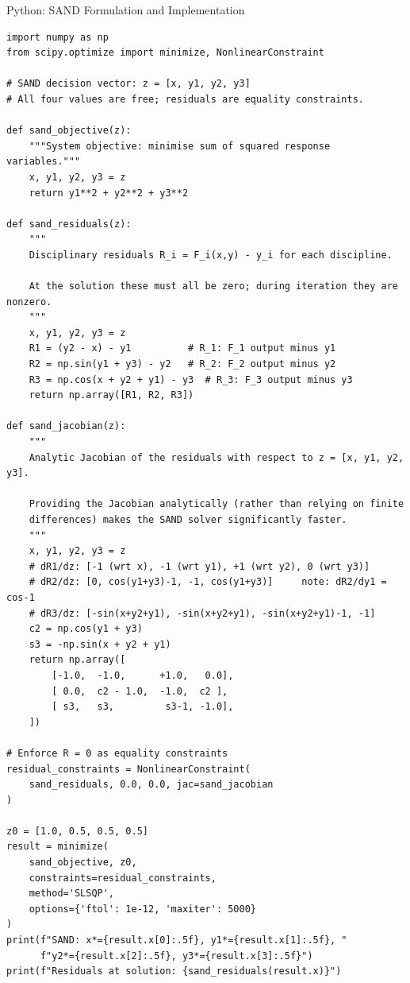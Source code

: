 \documentclass[aspectratio=169,10pt]{beamer}
\begin{document}
\begin{frame}[fragile]{Python: SAND Formulation and Implementation}

  \begin{lstlisting}[style=python]
import numpy as np
from scipy.optimize import minimize, NonlinearConstraint

# SAND decision vector: z = [x, y1, y2, y3]
# All four values are free; residuals are equality constraints.

def sand_objective(z):
    """System objective: minimise sum of squared response variables."""
    x, y1, y2, y3 = z
    return y1**2 + y2**2 + y3**2

def sand_residuals(z):
    """
    Disciplinary residuals R_i = F_i(x,y) - y_i for each discipline.

    At the solution these must all be zero; during iteration they are nonzero.
    """
    x, y1, y2, y3 = z
    R1 = (y2 - x) - y1          # R_1: F_1 output minus y1
    R2 = np.sin(y1 + y3) - y2   # R_2: F_2 output minus y2
    R3 = np.cos(x + y2 + y1) - y3  # R_3: F_3 output minus y3
    return np.array([R1, R2, R3])

def sand_jacobian(z):
    """
    Analytic Jacobian of the residuals with respect to z = [x, y1, y2, y3].

    Providing the Jacobian analytically (rather than relying on finite
    differences) makes the SAND solver significantly faster.
    """
    x, y1, y2, y3 = z
    # dR1/dz: [-1 (wrt x), -1 (wrt y1), +1 (wrt y2), 0 (wrt y3)]
    # dR2/dz: [0, cos(y1+y3)-1, -1, cos(y1+y3)]     note: dR2/dy1 = cos-1
    # dR3/dz: [-sin(x+y2+y1), -sin(x+y2+y1), -sin(x+y2+y1)-1, -1]
    c2 = np.cos(y1 + y3)
    s3 = -np.sin(x + y2 + y1)
    return np.array([
        [-1.0,  -1.0,      +1.0,   0.0],
        [ 0.0,  c2 - 1.0,  -1.0,  c2 ],
        [ s3,   s3,         s3-1, -1.0],
    ])

# Enforce R = 0 as equality constraints
residual_constraints = NonlinearConstraint(
    sand_residuals, 0.0, 0.0, jac=sand_jacobian
)

z0 = [1.0, 0.5, 0.5, 0.5]
result = minimize(
    sand_objective, z0,
    constraints=residual_constraints,
    method='SLSQP',
    options={'ftol': 1e-12, 'maxiter': 5000}
)
print(f"SAND: x*={result.x[0]:.5f}, y1*={result.x[1]:.5f}, "
      f"y2*={result.x[2]:.5f}, y3*={result.x[3]:.5f}")
print(f"Residuals at solution: {sand_residuals(result.x)}")
  \end{lstlisting}

\end{frame}
\end{document}
